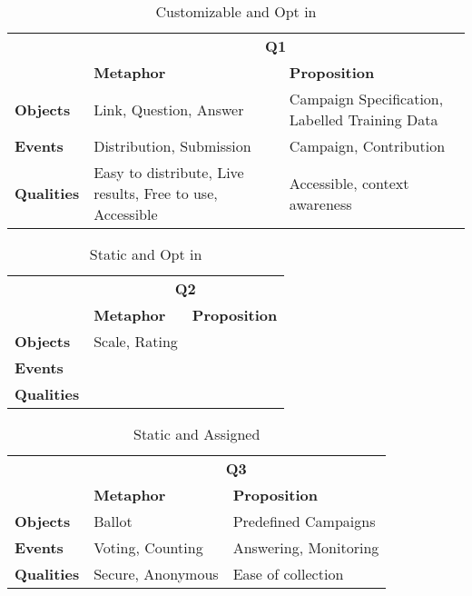 
\begin{table}[!htbp]
\centering
\begin{tabularx}{\textwidth}{X|X|X|}
\cline{2-3}
                                         & \multicolumn{2}{c|}{\textbf{Q1}}            \\ \cline{2-3}  
                                         & \textbf{Metaphor}                                     & \textbf{Proposition}    \\ \hline
\multicolumn{1}{|l|}{\textbf{Objects}}   & Link, Question, Answer                                & Campaign Specification, Labelled Training Data \\ \hline
\multicolumn{1}{|l|}{\textbf{Events}}    & Distribution, Submission                              & Campaign, Contribution         \\ \hline
\multicolumn{1}{|l|}{\textbf{Qualities}} & Easy to distribute, Live results, Free to use, Accessible & Accessible, context awareness  \\ \hline
\end{tabularx}
\caption{Customizable and Opt in}
\end{table}
\FloatBarrier

\begin{table}[!htbp]
\centering
\begin{tabular}{l|l|l|}
\cline{2-3}
                                         & \multicolumn{2}{c|}{\textbf{Q2}}         \\ \cline{2-3} 
                                         & \textbf{Metaphor} & \textbf{Proposition} \\ \hline
\multicolumn{1}{|l|}{\textbf{Objects}}   & Scale, Rating     &                      \\ \hline
\multicolumn{1}{|l|}{\textbf{Events}}    &                   &                      \\ \hline
\multicolumn{1}{|l|}{\textbf{Qualities}} &                   &                      \\ \hline
\end{tabular}
\caption{Static and Opt in}
\end{table}
\FloatBarrier

\begin{table}[!htbp]
\centering
\begin{tabular}{l|l|l|}
\cline{2-3}
                                         & \multicolumn{2}{c|}{\textbf{Q3}}         \\ \cline{2-3} 
                                         & \textbf{Metaphor} & \textbf{Proposition}  \\ \hline
\multicolumn{1}{|l|}{\textbf{Objects}}   & Ballot            & Predefined Campaigns  \\ \hline
\multicolumn{1}{|l|}{\textbf{Events}}    & Voting, Counting  & Answering, Monitoring \\ \hline
\multicolumn{1}{|l|}{\textbf{Qualities}} & Secure, Anonymous & Ease of collection    \\ \hline
\end{tabular}
\caption{Static and Assigned}
\end{table}
\FloatBarrier

